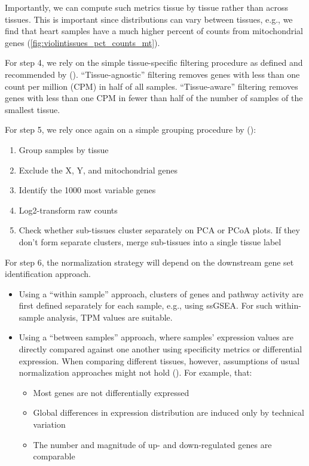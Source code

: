 \documentclass{article}
\begin{document}
Importantly, we can compute such metrics tissue by tissue rather than across tissues. This is important since distributions can vary between tissues, e.g., we find that heart samples have a much higher percent of counts from mitochondrial genes (\ref{fig:violintissues_pct_counts_mt}).

For step 4, we rely on the simple tissue-specific filtering procedure as defined and recommended by (\cite{Paulson2017-jv}). “Tissue-agnostic” filtering removes genes with less than one count per million (CPM) in half of all samples. “Tissue-aware” filtering removes genes with less than one CPM in fewer than half of the number of samples of the smallest tissue.

For step 5, we rely once again on a simple grouping procedure by (\cite{Paulson2017-jv}):
\begin{enumerate}
  \item Group samples by tissue
  \item Exclude the X, Y, and mitochondrial genes
  \item Identify the 1000 most variable genes
  \item Log2-transform raw counts
  \item Check whether sub-tissues cluster separately on PCA or PCoA plots. If they don't form separate clusters, merge sub-tissues into a single tissue label
\end{enumerate}

For step 6, the normalization strategy will depend on the downstream gene set identification approach.
\begin{itemize}
  \item Using a “within sample” approach, clusters of genes and pathway activity are first defined separately for each sample, e.g., using ssGSEA. For such within-sample analysis, TPM values are suitable.
  \item Using a “between samples” approach, where samples' expression values are directly compared against one another using specificity metrics or differential expression. When comparing different tissues, however, assumptions of usual normalization approaches might not hold (\cite{Paulson2017-jv}). For example, that:
  \begin{itemize}
    \item Most genes are not differentially expressed
    \item Global differences in expression distribution are induced only by technical variation
    \item The number and magnitude of up- and down-regulated genes are comparable
  \end{itemize}
\end{itemize}
\end{document}
